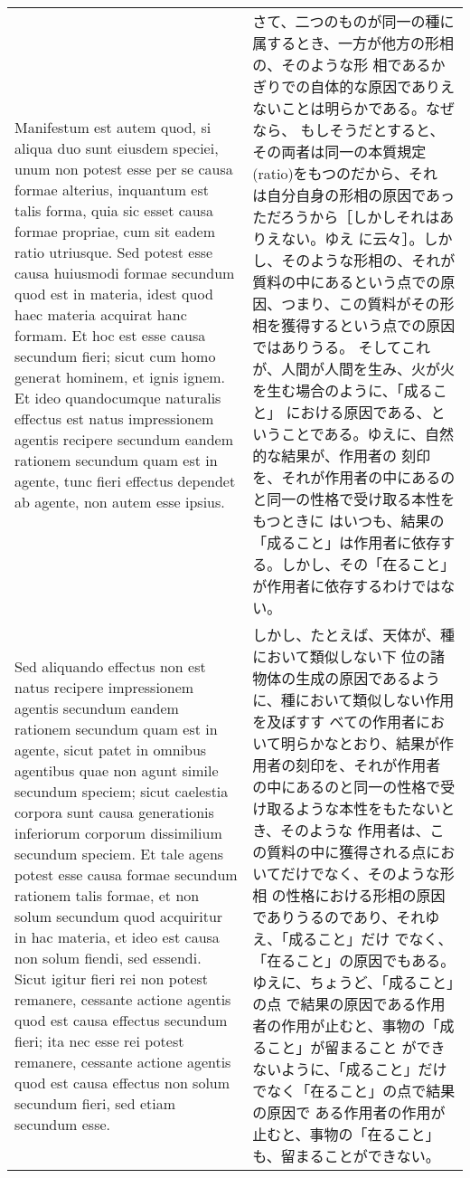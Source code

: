 \documentclass[10pt]{jsarticle} %
\begin{document}
\begin{longtable}{p{21em}p{21em}}
\\


Manifestum est autem
quod, si aliqua duo sunt eiusdem speciei, unum non potest esse per se
causa formae alterius, inquantum est talis forma, quia sic esset causa
formae propriae, cum sit eadem ratio utriusque. Sed potest esse causa
huiusmodi formae secundum quod est in materia, idest quod haec materia
acquirat hanc formam. Et hoc est esse causa secundum fieri; sicut cum
homo generat hominem, et ignis ignem. Et ideo quandocumque naturalis
effectus est natus impressionem agentis recipere secundum eandem
rationem secundum quam est in agente, tunc fieri effectus dependet ab
agente, non autem esse ipsius.

&

さて、二つのものが同一の種に属するとき、一方が他方の形相の、そのような形
 相であるかぎりでの自体的な原因でありえないことは明らかである。なぜなら、
 もしそうだとすると、その両者は同一の本質規定(ratio)をもつのだから、それ
 は自分自身の形相の原因であっただろうから［しかしそれはありえない。ゆえ
 に云々］。しかし、そのような形相の、それが質料の中にあるという点での原
 因、つまり、この質料がその形相を獲得するという点での原因ではありうる。
 そしてこれが、人間が人間を生み、火が火を生む場合のように、「成ること」
 における原因である、ということである。ゆえに、自然的な結果が、作用者の
 刻印を、それが作用者の中にあるのと同一の性格で受け取る本性をもつときに
 はいつも、結果の「成ること」は作用者に依存する。しかし、その「在ること」
 が作用者に依存するわけではない。


\\


Sed aliquando effectus non est natus
recipere impressionem agentis secundum eandem rationem secundum quam est
in agente, sicut patet in omnibus agentibus quae non agunt simile
secundum speciem; sicut caelestia corpora sunt causa generationis
inferiorum corporum dissimilium secundum speciem. Et tale agens potest
esse causa formae secundum rationem talis formae, et non solum secundum
quod acquiritur in hac materia, et ideo est causa non solum fiendi, sed
essendi. Sicut igitur fieri rei non potest remanere, cessante actione
agentis quod est causa effectus secundum fieri; ita nec esse rei potest
remanere, cessante actione agentis quod est causa effectus non solum
secundum fieri, sed etiam secundum esse.


&

しかし、たとえば、天体が、種において類似しない下
 位の諸物体の生成の原因であるように、種において類似しない作用を及ぼすす
 べての作用者において明らかなとおり、結果が作用者の刻印を、それが作用者
 の中にあるのと同一の性格で受け取るような本性をもたないとき、そのような
 作用者は、この質料の中に獲得される点においてだけでなく、そのような形相
 の性格における形相の原因でありうるのであり、それゆえ、「成ること」だけ
 でなく、「在ること」の原因でもある。ゆえに、ちょうど、「成ること」の点
 で結果の原因である作用者の作用が止むと、事物の「成ること」が留まること
 ができないように、「成ること」だけでなく「在ること」の点で結果の原因で
 ある作用者の作用が止むと、事物の「在ること」も、留まることができない。


\end{longtable}
\end{document}
